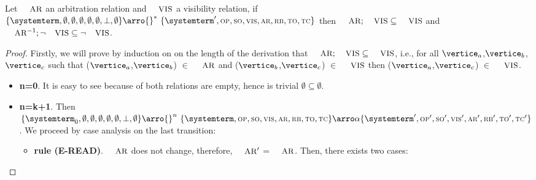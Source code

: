 \begin{theorem}

Let $\textsc{\small{AR}}$ an arbitration relation and $\textsc{\small{VIS}}$ a visibility relation, if $\environmenttran{\systemterm}{\emptyset}{\emptyset}{\emptyset}{\emptyset}{\emptyset}{\undefined}{\emptyset} \arro{} ^*\ \environmenttran{\systemterm'}{\op}{\so}{\vis}{\arb}{\rb}{\tx}{\tc}$ then $\textsc{\small{AR}};\textsc{\small{VIS}} \subseteq \textsc{\small{VIS}}$ and  $\textsc{\small{AR}}^{-1};\neg\textsc{\small{VIS}} \subseteq \neg\textsc{\small{VIS}}$.


\end{theorem}
 

\begin{proof} 
Firstly, we will prove by induction on on the length of the derivation that $\textsc{\small{AR}};\textsc{\small{VIS}} \subseteq \textsc{\small{VIS}}$, i.e., for all $\vertice_a$,$\vertice_b$,$\vertice_c$ such that ($\vertice_a$,$\vertice_b$) $\in$ $\textsc{\small{AR}}$ and ($\vertice_b$,$\vertice_c$) $\in$ $\textsc{\small{VIS}}$ then ($\vertice_a$,$\vertice_c$) $\in$ $\textsc{\small{VIS}}$.

\begin{itemize}
   \item{\bf n=0}. It is easy to see because of both relations are empty, hence is trivial $\emptyset \subseteq \emptyset$.
   \item{\bf n=k+1}. Then $\environmenttran{\systemterm_0}{\emptyset}{\emptyset}{\emptyset}{\emptyset}{\emptyset}{\undefined}{\emptyset} \arro{} ^n\ \environmenttran{\systemterm}{\op}{\so}{\vis}{\arb}{\rb}{\tx}{\tc} \arroi{\alpha} \environmenttran{\systemterm'}{\op'}{\so'}{\vis'}{\arb'}{\rb'}{\tx'}{\tc'}$. We proceed by case analysis on the last transition:
	
	\begin{itemize}
        \item {\bf rule (\textsc{E-READ})}. $\textsc{\small{AR}}$ does not change, therefore, $\textsc{\small{AR}}'$ = $\textsc{\small{AR}}$.  Then, there exists two cases: 
				

\end{itemize}
\end{itemize}
\end{proof}
